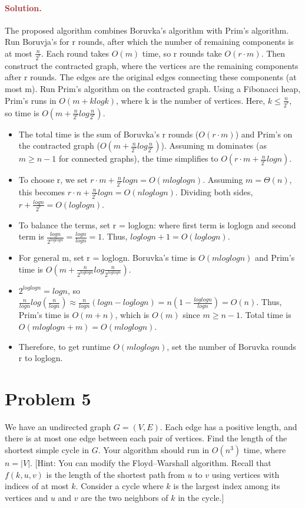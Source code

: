 \paragraph{\textcolor{brown}{Solution.}}
The proposed algorithm combines Boruvka's algorithm with Prim's algorithm. Run Boruvja's for r rounds, after which the number of remaining components is at most $\frac{n}{2^r}$. Each round takes $O(m)$ time, so r rounds take $O(r\cdot m)$. Then construct the contracted graph, where the vertices are the remaining components after r rounds. The edges are the original edges connecting these components (at most m). Run Prim's algorithm on the contracted graph. Using a Fibonacci heap, Prim's runs in  $O(m+klogk)$, where k is the number of vertices. Here, $k \leq \frac{n}{2^r}$, so time is $O(m+\frac{n}{2^r}log\frac{n}{2^r})$. \begin{itemize} \item The total time is the sum of Boruvka's r rounds ($O(r\cdot m)$) and Prim's on the contracted graph ($O(m+\frac{n}{2^r}log\frac{n}{2^r})$). Assuming m dominates (as $m\geq n - 1$ for connected graphs), the time simplifies to $O(r\cdot m + \frac{n}{2^r}log{n})$. \item To choose r, we set $r \cdot m + \frac{n}{2^r}log{n} = O(mloglogn)$. Assuming $m = \Theta(n)$, this becomes $r \cdot n + \frac{n}{2^r}log n = O(nloglogn)$. Dividing both sides, $r + \frac{logn}{2^r} = O(loglogn)$. \item To balance the terms, set r = loglogn: where first term is loglogn and second term is $\frac{logn}{2^{loglogn}} = \frac{logn}{logn} = 1$. Thus, $loglogn + 1 = O(loglogn)$. \item For general m, set r = loglogn. Boruvka's time is $O(mloglogn)$ and Prim's time is $O(m + \frac{n}{2^{loglogn}}log\frac{n}{2^{loglogn}})$. \item $2^{loglogn} = logn$, so $\frac{n}{logn}log(\frac{n}{logn}) \approx \frac{n}{logn}(logn - loglogn) = n(1 - \frac{loglogn}{logn}) = O(n)$. Thus, Prim's time is $O(m + n)$, which is $O(m)$ since $m\geq n - 1$. Total time is $O(mloglogn + m) = O(mloglogn)$. \item Therefore, to get runtime $O(mloglogn)$, set the number of Boruvka rounds r to loglogn. \end{itemize}


\section*{Problem 5}
We have an undirected graph $G = (V, E)$. Each edge has a positive length, and there is at most one edge between each pair of vertices. Find the length of the shortest simple cycle in $G$. Your algorithm should run in $O(n^3)$ time, where $n = |V|$. [Hint: You can modify the Floyd--Warshall algorithm. Recall that $f(k, u, v)$ is the length of the shortest path from $u$ to $v$ using vertices with indices of at most $k$. Consider a cycle where $k$ is the largest index among its vertices and $u$ and $v$ are the two neighbors of $k$ in the cycle.]

